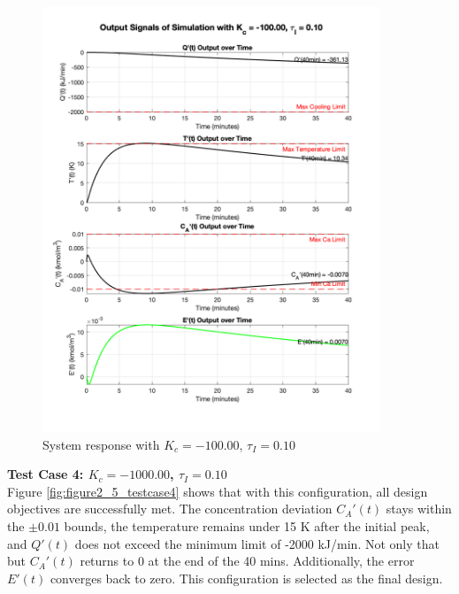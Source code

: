 \documentclass[12pt]{article}
\begin{document}
\begin{enumerate}
\begin{enumerate}
    \begin{figure}[H]
      \centering
      \includegraphics[width=0.900\textwidth]{Figures/figure2_5_testcase3.png}
      \caption{System response with $K_c = -100.00$, $\tau_I = 0.10$}
      \label{fig:figure2_5_testcase3}
    \end{figure}
    
    \clearpage
    \textbf{Test Case 4: $K_c = -1000.00$, $\tau_I = 0.10$} \\
    Figure \ref{fig:figure2_5_testcase4} shows that with this configuration, all design objectives are successfully met. The concentration deviation $C_A'(t)$ stays within the $\pm0.01$ bounds, the temperature remains under 15 K after the initial peak, and $Q'(t)$ does not exceed the minimum limit of -2000 kJ/min. Not only that but $C_A'(t)$ returns to 0 at the end of the 40 mins. Additionally, the error $E'(t)$ converges back to zero. This configuration is selected as the final design.
    

\end{enumerate}
\end{enumerate}
\end{document}
